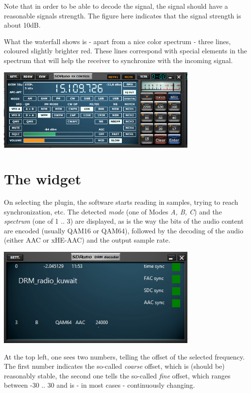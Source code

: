 \documentclass[10pt]{article}
\begin{document}
Note that in order to be able to decode the signal, the signal should
have a reasonable signals strength.  The figure here indicates that the signal strength is about 10dB.
\par
What the waterfall shows is - apart from a nice color spectrum - three
lines, coloured slightly brighter red. These lines correspond with special elements
in the spectrum that will help the receiver to synchronize with
the incoming signal.

\includegraphics[width=100mm]{drm-receiver-widget.png}

\section{The widget}
On selecting the plugin, the software starts reading in samples,
trying to reach synchronization, etc.
The detected {\em mode} (one of Modes {\em A, B, C})  and the {\em spectrum}
(one of 1 .. 3) are displayed, as is the way the bits of the
audio content are encoded (usually QAM16 or QAM64), followed by
the decoding of the audio (either AAC or xHE-AAC) and the output
sample rate.
\par

\includegraphics[width=100mm]{drm-decoder-widget-1.png}

At the top left, one sees two numbers, telling the offset of the selected
frequency. The first number indicates the so-called {\em coarse} offset,
which is (should be) reasonably stable, the second one tells the
so-called {\em fine} offset, which ranges between -30 .. 30 and is
- in most cases - continuously changing.
\end{document}
